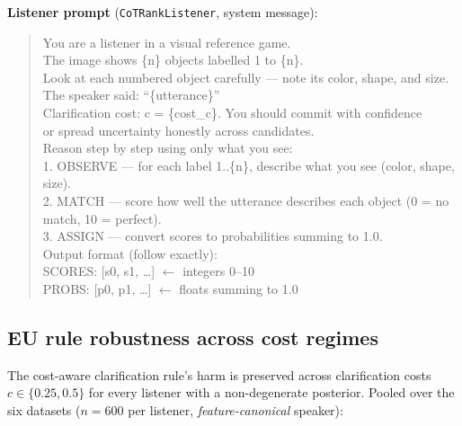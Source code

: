 \documentclass[11pt]{article}
\begin{document}
\vspace{1em}

\noindent\textbf{Listener prompt} (\texttt{CoTRankListener}, system message):

\begin{quote}\ttfamily\small
You are a listener in a visual reference game.\\[4pt]
The image shows \{n\} objects labelled 1 to \{n\}.\\
Look at each numbered object carefully --- note its color, shape, and size.\\[4pt]
The speaker said: ``\{utterance\}''\\[4pt]
Clarification cost: c = \{cost\_c\}. You should commit with confidence\\
or spread uncertainty honestly across candidates.\\[4pt]
Reason step by step using only what you see:\\
1. OBSERVE --- for each label 1..\{n\}, describe what you see (color, shape, size).\\
2. MATCH --- score how well the utterance describes each object (0 = no match, 10 = perfect).\\
3. ASSIGN --- convert scores to probabilities summing to 1.0.\\[4pt]
Output format (follow exactly):\\
SCORES: [s0, s1, \ldots] \quad $\leftarrow$ integers 0--10\\
PROBS:\phantom{S} [p0, p1, \ldots] \quad $\leftarrow$ floats summing to 1.0
\end{quote}

\subsection{EU rule robustness across cost regimes}
\label{app:a1}

The cost-aware clarification rule's harm is preserved across clarification
costs $c \in \{0.25, 0.5\}$ for every listener with a non-degenerate
posterior. Pooled over the six datasets ($n{=}600$ per listener,
\textit{feature-canonical} speaker):
\end{document}
